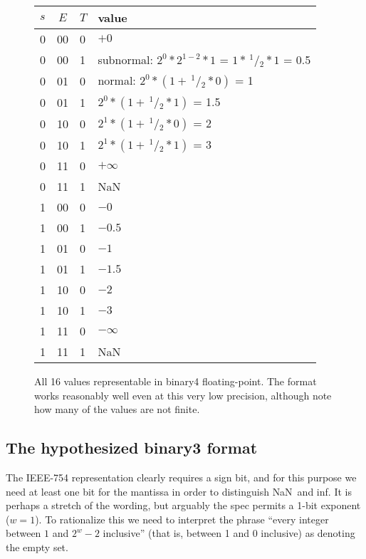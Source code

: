 \documentclass[twocolumn]{article}
\newcommand\sfrac[2]{\!{}\,^{#1}\!/{}\!_{#2}}
\newcommand\nan{\textsf{NaN}}
\renewcommand\inf{\textsf{inf}}
\begin{document}
\begin{figure}[h]
\begin{tabular}{|l@{\,}c@{\,}l|p{2.5in}|}
\hline
  $s$ & $E$ & $T$ & value \\
  \hline
0 & 00 & 0 &   $+0$ \\
0 & 00 & 1 &    subnormal: %
                $2^0 * 2^{1-2} * 1$ =
                $1 * \sfrac{1}{2} * 1$ = 0.5 \\
0 & 01 & 0 &    normal: %
                $2^0 * (1 + \sfrac{1}{2} * 0)$ = 1 \\
0 & 01 & 1 &    $2^0 * (1 + \sfrac{1}{2} * 1)$ = 1.5 \\
0 & 10 & 0 &    $2^1 * (1 + \sfrac{1}{2} * 0)$ = 2 \\
0 & 10 & 1 &    $2^1 * (1 + \sfrac{1}{2} * 1)$ = 3 \\
0 & 11 & 0 &   $+\infty$ \\
0 & 11 & 1 &    \nan \\
1 & 00 & 0 &   $-0$ \\
1 & 00 & 1 &   $-0.5$ \\
1 & 01 & 0 &   $-1$ \\ 
1 & 01 & 1 &   $-1.5$ \\
1 & 10 & 0 &   $-2$ \\
1 & 10 & 1 &   $-3$ \\ 
1 & 11 & 0 &   $-\infty$ \\
1 & 11 & 1 &    \nan \\
\hline
\end{tabular}
\caption{All 16 values representable in binary4 floating-point.
  The format works reasonably well even at this very low precision,
  although note how many of the values are not finite.} \label{fig:allvalues4}
\end{figure}


\subsection{The hypothesized binary3 format} \label{sec:binary3}
The IEEE-754 representation clearly requires a sign bit, and for this
purpose we need at least one bit for the mantissa in order to
distinguish \nan\ and \inf. It is perhaps a stretch of the wording,
but arguably the spec permits a 1-bit exponent ($w = 1$). To
rationalize this we need to interpret the phrase ``every integer
between $1$ and $2^w-2$ inclusive'' (that is, between 1 and 0 inclusive)
as denoting the empty set.
\end{document}
